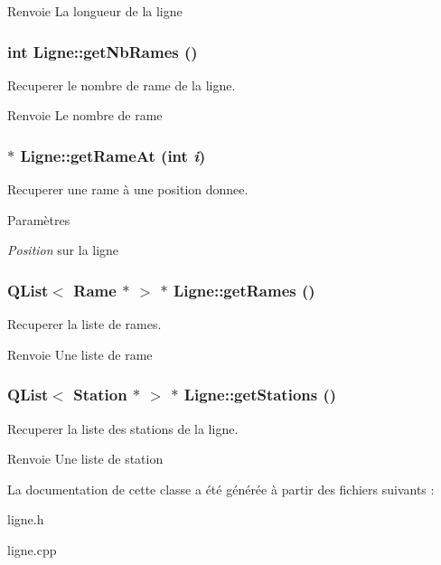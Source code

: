 \begin{DoxyReturn}{Renvoie}
La longueur de la ligne 
\end{DoxyReturn}
\hypertarget{classLigne_aa48c45c4ab09834ed3ce563985b4955a}{
\subsubsection[{getNbRames}]{\setlength{\rightskip}{0pt plus 5cm}int Ligne::getNbRames ()}}
\label{classLigne_aa48c45c4ab09834ed3ce563985b4955a}


Recuperer le nombre de rame de la ligne. 

\begin{DoxyReturn}{Renvoie}
Le nombre de rame 
\end{DoxyReturn}
\hypertarget{classLigne_a6c0c5346eff4bc5713241fd4f07fb9ef}{
\subsubsection[{getRameAt}]{ $\ast$ Ligne::getRameAt (int {\em i})}}
\label{classLigne_a6c0c5346eff4bc5713241fd4f07fb9ef}


Recuperer une rame à une position donnee. 


\begin{DoxyParams}{Paramètres}
\item[{\em Position}]sur la ligne \end{DoxyParams}
\hypertarget{classLigne_aed26ffc704040dea3ba2b1a8b184a550}{
\subsubsection[{getRames}]{\setlength{\rightskip}{0pt plus 5cm}QList$<$ {\bf Rame} $\ast$ $>$ $\ast$ Ligne::getRames ()}}
\label{classLigne_aed26ffc704040dea3ba2b1a8b184a550}


Recuperer la liste de rames. 

\begin{DoxyReturn}{Renvoie}
Une liste de rame 
\end{DoxyReturn}
\hypertarget{classLigne_a8ced36e42672723b6e0037c389e59bb4}{
\subsubsection[{getStations}]{\setlength{\rightskip}{0pt plus 5cm}QList$<$ {\bf Station} $\ast$ $>$ $\ast$ Ligne::getStations ()}}
\label{classLigne_a8ced36e42672723b6e0037c389e59bb4}


Recuperer la liste des stations de la ligne. 

\begin{DoxyReturn}{Renvoie}
Une liste de station 
\end{DoxyReturn}


La documentation de cette classe a été générée à partir des fichiers suivants :\begin{DoxyCompactItemize}
\item 
ligne.h\item 
ligne.cpp\end{DoxyCompactItemize}

